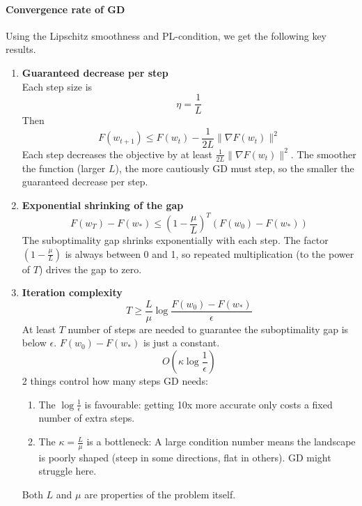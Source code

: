 \documentclass[../Probability.tex]{subfiles}
\begin{document}
\paragraph{Convergence rate of GD}
Using the Lipschitz smoothness and PL-condition, we get the following key results.\\
\begin{enumerate}
    \item \textbf{Guaranteed decrease per step}\\
    Each step size is 
    $$\eta = \frac{1}{L}$$
    Then
    $$F(w_{t+1}) \leq F(w_t) - \frac{1}{2L}\|\nabla F(w_t)\|^2$$
    Each step decreases the objective by at least $\frac{1}{2L}\|\nabla F(w_t)\|^2$. The smoother the function (larger $L$), the more cautiously GD must step, so the smaller the guaranteed decrease per step.\\
    \item \textbf{Exponential shrinking of the gap}
    $$F(w_T) - F(w_*) \leq \left(1 - \frac{\mu}{L}\right)^T(F(w_0) - F(w_*))$$
    The suboptimality gap shrinks exponentially with each step. The factor $(1 - \frac{\mu}{L})$ is always between 0 and 1, so repeated multiplication (to the power of $T$) drives the gap to zero.\\
    \item \textbf{Iteration complexity}
    $$T \geq \frac{L}{\mu}\log\frac{F(w_0) - F(w_*)}{\epsilon}$$
    At least $T$ number of steps are needed to guarantee the suboptimality gap is below $\epsilon$. $F(w_0) - F(w_*)$ is just a constant.
    $$O\left(\kappa \log\frac{1}{\epsilon}\right)$$
    2 things control how many steps GD needs:
    \begin{enumerate}
        \item The $\log\frac{1}{\epsilon}$ is favourable: getting 10x more accurate only costs a fixed number of extra steps.
        \item The $\kappa = \frac{L}{\mu}$ is a bottleneck: A large condition number means the landscape is poorly shaped (steep in some directions, flat in others). GD might struggle here.
    \end{enumerate}
    Both $L$ and $\mu$ are properties of the problem itself.
\end{enumerate}
\end{document}
